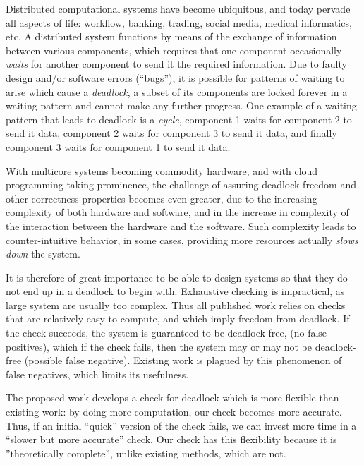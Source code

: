 Distributed computational systems have become ubiquitous, and today pervade all
aspects of life: workflow, banking, trading, social media, medical informatics,
etc.  A distributed system functions by means of the exchange of information
between various components, which requires that one component occasionally
\emph{waits} for another component to send it the required information.  Due to
faulty design and/or software errors (``bugs''), it is possible for patterns of
waiting to arise which cause a {\em deadlock}, \ie a subset of its components
are locked forever in a waiting pattern and cannot make any further progress.
One example of a waiting pattern that leads to deadlock is a \emph{cycle}, \eg
component 1 waits for component 2 to send it data, component 2 waits for
component 3 to send it data, and finally component 3 waits for component 1 to
send it data.

With multicore systems becoming commodity hardware, and with cloud programming
taking prominence, the challenge of assuring deadlock freedom and other
correctness properties becomes even greater, due to the increasing complexity of
both hardware and software, and in the increase in complexity of the interaction
between the hardware and the software. Such complexity leads to
counter-intuitive behavior, \eg in some cases, providing more resources actually
\emph{slows down} the system.

It is therefore of great importance to be able to design systems so that they do
not end up in a deadlock to begin with.  Exhaustive checking is impractical, as
large system are usually too complex. Thus all published work relies on checks
that are relatively easy to compute, and which imply freedom from deadlock. If
the check succeeds, the system is guaranteed to be deadlock free, (no false
positives), which if the check fails, then the system may or may not be
deadlock-free (possible false negative).  Existing work is plagued by this
phenomenon of false negatives, which limits its usefulness.

The proposed work develops a check for deadlock which is more flexible than
existing work: by doing more computation, our check becomes more accurate. Thus,
if an initial ``quick'' version of the check fails, we can invest more time in
a ``slower but more accurate'' check.  Our check has this flexibility because it
is ''theoretically complete'', unlike existing methods, which are not.



%
